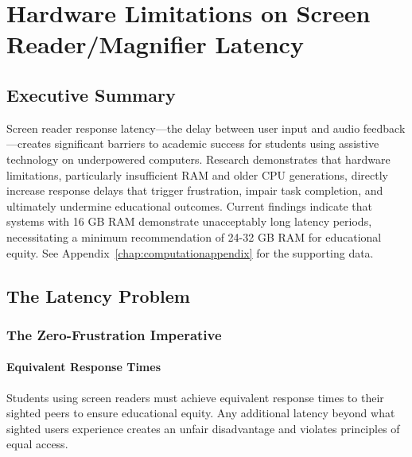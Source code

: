 \chapter{Hardware Limitations on Screen Reader/Magnifier Latency}\label{vision-assistive-technology-laptop-computer-requirements}
\raggedright
\section{Executive Summary}\label{executive-summary}

Screen reader response latency—the delay between user input and audio feedback—creates significant barriers to academic success for students using assistive technology on underpowered computers.\supercite{Foley2017AssistiveTechnologyOutcomes} Research demonstrates that hardware limitations, particularly insufficient RAM and older CPU generations, directly increase response delays that trigger frustration, impair task completion, and ultimately undermine educational outcomes.\supercite{Kelly2011, StudentOutcomesResearch} Current findings indicate that systems with 16 GB RAM demonstrate unacceptably long latency periods, necessitating a minimum recommendation of 24-32 GB RAM for educational equity. See Appendix~\ref{chap:computationappendix} for the supporting data.

\section{The Latency Problem}\label{the-latency-problem}

\subsection{The Zero-Frustration Imperative}\label{the-zero-frustration-imperative}

\subsubsection{Equivalent Response Times}

Students using screen readers must achieve equivalent response times to their sighted peers to ensure educational equity. Any additional latency beyond what sighted users experience creates an unfair disadvantage and violates principles of equal access.\supercite{ADA1990, Section508}

